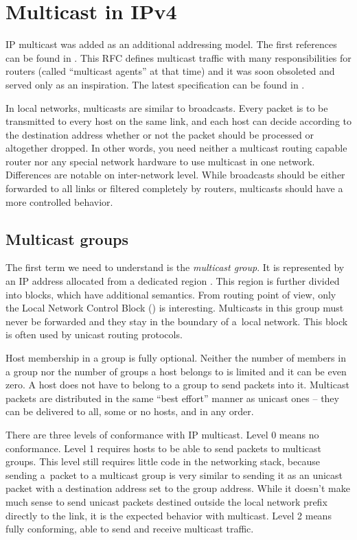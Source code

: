 \chapter{Multicast in IPv4}

IP multicast was added as an additional addressing model. The first
references can be found in . This RFC defines multicast traffic
with many responsibilities for routers (called ``multicast agents'' at that time)
and it was soon obsoleted and served only as an inspiration. The latest
specification can be found in .

In local networks, multicasts are similar to broadcasts. Every packet is to be
transmitted to every host on the same link, and each host can decide according to
the destination address whether or not the packet should be processed or altogether
dropped. In other words, you need neither a multicast routing capable router
nor any special network hardware to use multicast in one network. Differences
are notable on inter-network level. While broadcasts should be either forwarded
to all links or filtered completely by routers, multicasts should have a more
controlled behavior.

\section{Multicast groups}

The first term we need to understand is the \emph{multicast group}. It is represented by an IP
address allocated from a dedicated region . This region is further
divided into blocks, which have additional semantics. From routing point of
view, only the Local Network Control Block () is
interesting. Multicasts in this group must never be forwarded and they stay
in the boundary of a~local network. This block is often used by unicast
routing protocols.

Host membership in a group is fully optional. Neither the number of members in
a group nor the number of groups a host belongs to is limited and it can be even
zero. A host does not have to belong to a group to send packets into it.
Multicast packets are distributed in the same ``best effort'' manner as unicast ones -- they can
be delivered to all, some or no hosts, and in any order.

There are three levels of conformance with IP multicast. Level 0 means no
conformance. Level 1 requires hosts to be able to send packets to multicast
groups. This level still requires little code in the networking stack, because
sending a~packet to a multicast group is very similar to sending it as an unicast
packet with a destination address set to the group address. While it doesn't make much
sense to send unicast packets destined outside the local network prefix directly
to the link, it is the expected behavior with multicast. Level 2 means fully
conforming, able to send and receive multicast traffic.

